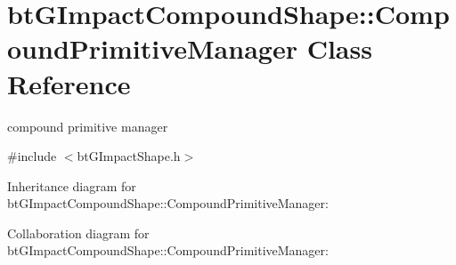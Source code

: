 \hypertarget{classbt_g_impact_compound_shape_1_1_compound_primitive_manager}{\section{bt\+G\+Impact\+Compound\+Shape\+:\+:Compound\+Primitive\+Manager Class Reference}
\label{classbt_g_impact_compound_shape_1_1_compound_primitive_manager}
}


compound primitive manager  




{\ttfamily \#include $<$bt\+G\+Impact\+Shape.\+h$>$}



Inheritance diagram for bt\+G\+Impact\+Compound\+Shape\+:\+:Compound\+Primitive\+Manager\+:


Collaboration diagram for bt\+G\+Impact\+Compound\+Shape\+:\+:Compound\+Primitive\+Manager\+:
